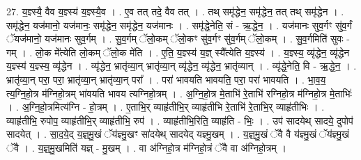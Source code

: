 \documentclass[17pt]{extarticle}
\begin{document}
27. य॒ज्ञ्स्यै॒ वैव य॒ज्ञ्स्य॑ य॒ज्ञ्स्यै॒व । . ए॒व तत् तदे॒ वैव तत् । . तथ् समृ॑द्धेन॒ समृ॑द्धेन॒ तत् तथ् समृ॑द्धेन । . समृ॑द्धेन॒ यज॑मानो॒ यज॑मानः॒ समृ॑द्धेन॒ समृ॑द्धेन॒ यज॑मानः । . समृ॑द्धे॒नेति॒ सं - ऋ॒द्धे॒न॒ । . यज॑मानः सुव॒र्गꣳ सु॑व॒र्गं ॅयज॑मानो॒ यज॑मानः सुव॒र्गम् । . सु॒व॒र्गम् ॅलो॒कम् ॅलो॒कꣳ सु॑व॒र्गꣳ सु॑व॒र्गम् ॅलो॒कम् । . सु॒व॒र्गमिति॑ सुवः - गम् । . लो॒क मे᳚त्येति लो॒कम् ॅलो॒क मे॑ति । . ए॒ति॒ य॒ज्ञ्स्य॑ य॒ज्ञ् स्यै᳚त्येति य॒ज्ञ्स्य॑ । . य॒ज्ञ्स्य॒ व्यृ॑द्धेन॒ व्यृ॑द्धेन य॒ज्ञ्स्य॑ य॒ज्ञ्स्य॒ व्यृ॑द्धेन । . व्यृ॑द्धेन॒ भ्रातृ॑व्या॒न् भ्रातृ॑व्या॒न् व्यृ॑द्धेन॒ व्यृ॑द्धेन॒ भ्रातृ॑व्यान् । . व्यृ॑द्धे॒नेति॒ वि - ऋ॒द्धे॒न॒ । . भ्रातृ॑व्या॒न् परा॒ परा॒ भ्रातृ॑व्या॒न् भ्रातृ॑व्या॒न् परा᳚ । . परा॑ भावयति भावयति॒ परा॒ परा॑ भावयति । . भा॒व॒य॒ त्य॒ग्नि॒हो॒त्र म॑ग्निहो॒त्रम् भा॑वयति भावय त्यग्निहो॒त्रम् । . अ॒ग्नि॒हो॒त्र मे॒ताभि॑ रे॒ताभि॑ रग्निहो॒त्र म॑ग्निहो॒त्र मे॒ताभिः॑ । . अ॒ग्नि॒हो॒त्रमित्य॑ग्नि - हो॒त्रम् । . ए॒ताभि॒र् व्याहृ॑तीभि॒र् व्याहृ॑तीभि रे॒ताभि॑ रे॒ताभि॒र् व्याहृ॑तीभिः । . व्याहृ॑तीभि॒ रुपोप॒ व्याहृ॑तीभि॒र् व्याहृ॑तीभि॒ रुप॑ । . व्याहृ॑तीभि॒रिति॒ व्याहृ॑ति - भिः॒ । . उप॑ सादयेथ् सादये॒ दुपोप॑ सादयेत् । . सा॒द॒ये॒द् य॒ज्ञ्॒मु॒खं ॅय॑ज्ञ्मु॒खꣳ सा॑दयेथ् सादयेद् यज्ञ्मु॒खम् । . य॒ज्ञ्॒मु॒खं ॅवै वै य॑ज्ञ्मु॒खं ॅय॑ज्ञ्मु॒खं ॅवै । . य॒ज्ञ्॒मु॒खमिति॑ यज्ञ् - मु॒खम् । . वा अ॑ग्निहो॒त्र म॑ग्निहो॒त्रं ॅवै वा अ॑ग्निहो॒त्रम् । \newline
\end{document}
